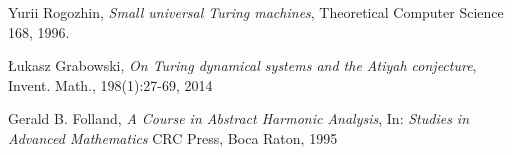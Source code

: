 \begin{thebibliography}{1}

	Yurii Rogozhin,
	\emph{Small universal Turing machines},
	Theoretical Computer Science 168,
	1996.

	\L{}ukasz Grabowski,
	\emph{On Turing dynamical systems and the Atiyah conjecture},
	Invent. Math., 198(1):27-69,
	2014
	
	Gerald B. Folland,
	\emph{A Course in Abstract Harmonic Analysis},
	In: \emph{Studies in Advanced Mathematics}
	CRC Press,
	Boca Raton,
	1995

\end{thebibliography}
